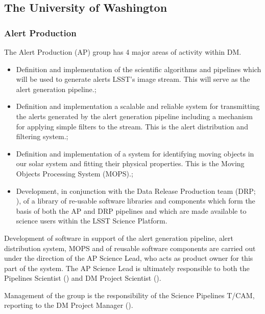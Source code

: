 \subsection {The University of Washington\label{sect:uw}}

\subsubsection{Alert Production\label{sect:ap}}

The Alert Production (AP) group has 4 major areas of activity within DM.

\begin{itemize}

  \item{Definition and implementation of the scientific algorithms and pipelines which will be used to generate alerts LSST's image stream.  This will serve as the alert generation pipeline.;}

  \item{Definition and implementation a scalable and reliable system for transmitting the alerts generated by the alert generation pipeline including a mechanism for applying simple filters to the stream. This is the alert distribution and filtering system.;}
  
  \item{Definition and implementation of a system for identifying moving objects in our solar system and fitting their physical properties.  This is the Moving Objects Processing System (MOPS).;}

  \item{Development, in conjunction with the Data Release Production team (DRP; ), of a library of re-usable software libraries and components which form the basis of both the AP and DRP pipelines and which are made available to science users within the LSST Science Platform.}

\end{itemize}

Development of software in support of the alert generation pipeline, alert distribution system, MOPS and of reusable software components are carried out under the direction of the AP Science Lead, who acts as product owner for this part of the system.
The AP Science Lead is ultimately responsible to both the Pipelines Scientist () and DM Project Scientist ().

Management of the group is the responsibility of the Science Pipelines T/CAM, reporting to the DM Project Manager ().

